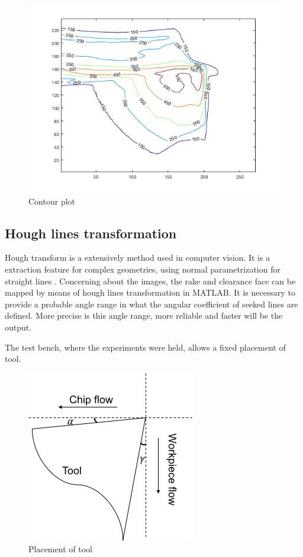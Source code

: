 	\begin{figure}[H]
		\centering
		\captionsetup{justification=centering}
		\includegraphics[width=0.6\linewidth]{Cap4/contour.jpg}
		\caption{Contour plot}
		\label{fig:contour}
	\end{figure}

	\subsection{Hough lines transformation}
	\label{ch:sechough}
	Hough transform is a extensively method used in computer vision. It is a extraction feature for complex geometries, using normal parametrization for straight lines \cite{duda1972use}. Concerning about the images, the rake and clearance face can be mapped by means of hough lines transformation in MATLAB. It is necessary to provide a probable angle range in what the angular coefficient of seeked lines are defined. More precise is this angle range, more reliable and faster will be the output.

	The test bench, where the experiments were held, allows a fixed placement of tool.

	\begin{figure}[H]
		\centering
		\captionsetup{justification=centering}
		\includegraphics[width=0.4\linewidth]{Cap4/imgset.jpg}
		\caption{Placement of tool}
		\label{fig:imgset}
	\end{figure}

